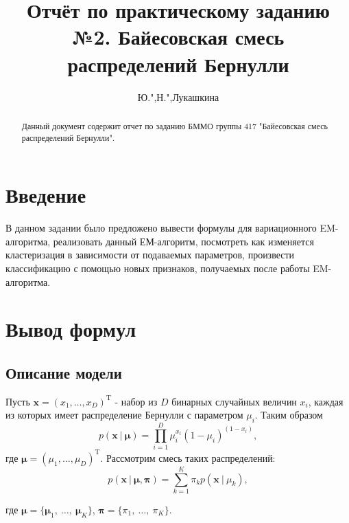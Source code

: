 \documentclass[twoside]{article}
\begin{document}
	\title[Байесовская смесь распределений Бернулли]{Отчёт по практическому заданию №2. Байесовская смесь распределений Бернулли}
	\author{Ю.",Н.",Лукашкина}
	\maketitle
	\begin{abstract}
		Данный документ содержит отчет по заданию БММО группы 417 "Байесовская смесь распределений Бернулли".
	\end{abstract}
	
	\tableofcontents
	
\section{Введение}\label{sec:quickstart}
	В данном задании было предложено вывести формулы для вариационного EM-алгоритма, реализовать данный ЕМ-алгоритм, посмотреть как изменяется кластеризация в зависимости от подаваемых параметров, произвести классификацию с помощью новых признаков, получаемых после работы EM-алгоритма.

\section{Вывод формул}
\subsection{Описание модели}
Пусть $\textbf{x} = (x_1, \dots, x_D)^\text{T}$ - набор из $D$ бинарных случайных величин $x_i$, каждая из которых имеет распределение
Бернулли с параметром $\mu_i$. Таким образом
\begin{equation*}\label{eq:i}
p(\textbf{x}\:|\:\boldsymbol{\mu}) = \prod_{i = 1}^D \mu_i^{x_i}(1-\mu_i)^{(1-x_i)},
\end{equation*}
где $\boldsymbol\mu = (\mu_1, \dots, \mu_D)^{\text{T}}$.
 Рассмотрим смесь таких распределений:
\begin{equation}\label{eq:pi}
p({\textbf{x}} \:|\: \boldsymbol{\mu}, \boldsymbol{\pi}) = \sum_{k = 1}^K {\pi}_k p({\textbf{x}} \:|\: {\mu}_k),	
\end{equation}


где $\boldsymbol{\mu} = \{\boldsymbol\mu_1,\: \dots,\: \boldsymbol\mu_K\}$, $\boldsymbol{\pi} =\{ \pi_1,\: \dots,\: \pi_K\}$.
\end{document}
